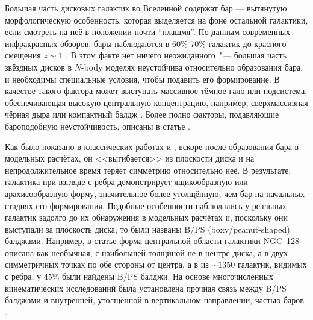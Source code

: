 \documentclass{trlnotes}
\begin{document}
Большая часть дисковых галактик во Вселенной содержат бар --- вытянутую морфологическую особенность, которая выделяется на 
фоне остальной галактики, если смотреть на неё в положении почти ``плашмя''. По данным современных инфракрасных 
обзоров, бары наблюдаются в 60\%-70\% галактик до красного смещения $z\sim 1$ \citep{marinova2007}.
В этом факте нет ничего неожиданного~"--- большая часть звёздных дисков в $N$-body моделях неустойчива
относительно образования бара, и необходимы специальные условия, чтобы подавить его формирование. В качестве такого фактора может выступать массивное тёмное гало или подсистема, обеспечивающая высокую
центральную концентрацию, например, сверхмассивная чёрная дыра \citep{shen2004} или компактный балдж
\citep{saha2018}. Более полно факторы, подавляющие бароподобную неустойчивость, описаны в
статье \citet{sellwood2019}.

%
Как было показано в классических работах \citet{combes1981a} и \citet{raha1991}, вскоре после
образования бара в модельных расчётах, он <<выгибается>> из плоскости диска и на непродолжительное время теряет симметрию относительно неё. В
результате, галактика при взгляде с ребра демонстрирует ящикообразную или арахисообразную форму, значительное
более утолщённую, чем бар на начальных стадиях его формирования. Подобные особенности наблюдались у реальных галактик задолго до их обнаружения в
модельных расчётах и, поскольку они выступали за плоскость диска, то были названы B/PS (boxy/peanut-shaped) балджами. Например, в статье
\citet{burbidge1959} форма центральной области галактики NGC~128 описана как необычная, с наибольшей толщиной не в
центре диска, а в двух симметричных точках по обе стороны от центра, а в \citet{lutticke2000} из $\sim\!1350$ галактик, видимых с ребра, у $45\%$ были найдены B/PS балджи.
На основе многочисленных кинематических исследований была установлена прочная связь между B/PS балджами и внутренней, утолщённой в вертикальном направлении, частью баров
\citep{kuijken1995,bureau1999,chung2004,bureau2006}. 
\end{document}

